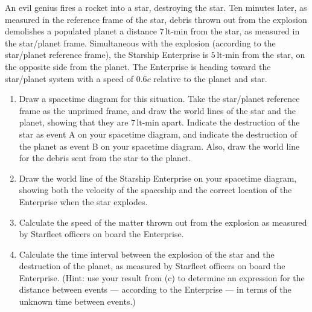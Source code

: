 \begin{exercise}
An evil genius fires a rocket into a star, destroying the star.
Ten minutes later, as measured in the reference frame of the star,
debris thrown out from the explosion demolishes a
populated planet a distance $7\,\text{lt-min}$ from the star, as measured
in the star/planet frame.  Simultaneous with the explosion (according
to the star/planet reference frame), the Starship
Enterprise is $5\,\text{lt-min}$  from the star, on the opposite side from
the planet.  The Enterprise is
heading toward the star/planet system with a
speed of $0.6c$ relative to the planet and star.
\begin{enumerate}
     \item Draw a spacetime diagram for this situation.  Take the
       star/planet reference frame as the unprimed frame, and draw the
       world lines of the star and the planet, showing that they are
       $7\,\text{lt-min}$ apart.  Indicate the destruction of the star
       as event A on your spacetime diagram, and indicate the
       destruction of the planet as event B on your spacetime diagram.
       Also, draw the world line for the debris sent from the star to the
       planet.
     \item Draw the world line of the Starship Enterprise on your spacetime
     diagram, showing both the velocity of the spaceship and the correct
     location of the Enterprise when the star explodes.
    \item Calculate the speed of the matter thrown out from the explosion
     as measured by Starfleet officers on board the Enterprise.
     \item Calculate the time interval between the explosion of the star
     and the destruction of the planet, as measured by Starfleet officers
     on board the Enterprise.  (Hint:  use your result from (c) to
     determine an expression for the distance between events ---
     according to the Enterprise --- in terms of the unknown time between
     events.)
     \end{enumerate}
\label{prob:evil_genius}
\end{exercise}


